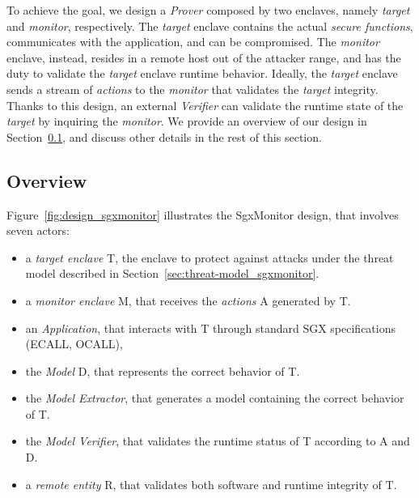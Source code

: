 To achieve the goal, we design a \emph{Prover} composed by two 
enclaves, namely \emph{target} and \emph{monitor}, respectively.
The \emph{target} enclave contains the actual \emph{secure functions}, 
communicates with the application, and can be compromised.
The \emph{monitor} enclave, instead, resides in a remote host out 
of the attacker range, and has the duty to validate the \emph{target} enclave 
runtime behavior.
Ideally, the \emph{target} enclave sends a stream of \emph{actions} to 
the \emph{monitor} that validates the \emph{target} integrity.
Thanks to this design, an external \emph{Verifier} can validate the runtime 
state of the \emph{target} by inquiring the \emph{monitor}.
We provide an overview of our design in Section~\ref{ssec:overview}, and 
discuss other details in the rest of this section.

\subsection{Overview}
\label{ssec:overview}
Figure~\ref{fig:design_sgxmonitor} illustrates the SgxMonitor design, that 
involves 
seven 
actors:
\begin{itemize}
	\item a \emph{target enclave} T, the enclave to protect against attacks 
	under the
	threat model described in Section~\ref{sec:threat-model_sgxmonitor}.
	\item a \emph{monitor enclave} M, that receives the \emph{actions} A 
	generated by T.
	\item an \emph{Application}, that interacts with T through standard SGX 
	specifications (\eg ECALL, OCALL),
	\item the \emph{Model} D, that represents the correct behavior of T.
	\item the \emph{Model Extractor}, that generates a model containing
	the correct behavior of T.
	\item the \emph{Model Verifier}, that validates the runtime status of T 
	according to A and D.
	\item a \emph{remote entity} R, that validates both software and runtime 
	integrity of T.
\end{itemize}

